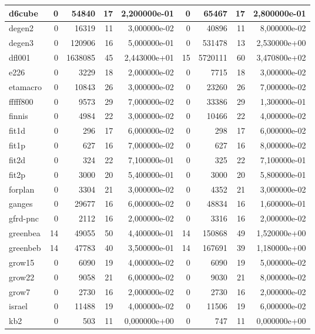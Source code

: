 \begin{tabular}{|l|r|r|r|r|r|r|r|r|}
d6cube & 0 & 54840 & 17 & 2,200000e-01 & 0 & 65467 & 17 & 2,800000e-01 \\ \hline
degen2 & 0 & 16319 & 11 & 3,000000e-02 & 0 & 40896 & 11 & 8,000000e-02 \\ \hline
degen3 & 0 & 120906 & 16 & 5,000000e-01 & 0 & 531478 & 13 & 2,530000e+00 \\ \hline
dfl001 & 0 & 1638085 & 45 & 2,443000e+01 & 15 & 5720111 & 60 & 3,470800e+02 \\ \hline
e226 & 0 & 3229 & 18 & 2,000000e-02 & 0 & 7715 & 18 & 3,000000e-02 \\ \hline
etamacro & 0 & 10843 & 26 & 3,000000e-02 & 0 & 23260 & 26 & 7,000000e-02 \\ \hline
fffff800 & 0 & 9573 & 29 & 7,000000e-02 & 0 & 33386 & 29 & 1,300000e-01 \\ \hline
finnis & 0 & 4984 & 22 & 3,000000e-02 & 0 & 10466 & 22 & 4,000000e-02 \\ \hline
fit1d & 0 & 296 & 17 & 6,000000e-02 & 0 & 298 & 17 & 6,000000e-02 \\ \hline
fit1p & 0 & 627 & 16 & 7,000000e-02 & 0 & 627 & 16 & 8,000000e-02 \\ \hline
fit2d & 0 & 324 & 22 & 7,100000e-01 & 0 & 325 & 22 & 7,100000e-01 \\ \hline
fit2p & 0 & 3000 & 20 & 5,400000e-01 & 0 & 3000 & 20 & 5,800000e-01 \\ \hline
forplan & 0 & 3304 & 21 & 3,000000e-02 & 0 & 4352 & 21 & 3,000000e-02 \\ \hline
ganges & 0 & 29677 & 16 & 6,000000e-02 & 0 & 48834 & 16 & 1,600000e-01 \\ \hline
gfrd-pnc & 0 & 2112 & 16 & 2,000000e-02 & 0 & 3316 & 16 & 2,000000e-02 \\ \hline
greenbea & 14 & 49055 & 50 & 4,400000e-01 & 14 & 150868 & 49 & 1,520000e+00 \\ \hline
greenbeb & 14 & 47783 & 40 & 3,500000e-01 & 14 & 167691 & 39 & 1,180000e+00 \\ \hline
grow15 & 0 & 6090 & 19 & 4,000000e-02 & 0 & 6090 & 19 & 5,000000e-02 \\ \hline
grow22 & 0 & 9058 & 21 & 6,000000e-02 & 0 & 9030 & 21 & 8,000000e-02 \\ \hline
grow7 & 0 & 2730 & 16 & 2,000000e-02 & 0 & 2730 & 16 & 2,000000e-02 \\ \hline
israel & 0 & 11488 & 19 & 4,000000e-02 & 0 & 11506 & 19 & 6,000000e-02 \\ \hline
kb2 & 0 & 503 & 11 & 0,000000e+00 & 0 & 747 & 11 & 0,000000e+00 \\ \hline

\end{tabular}
